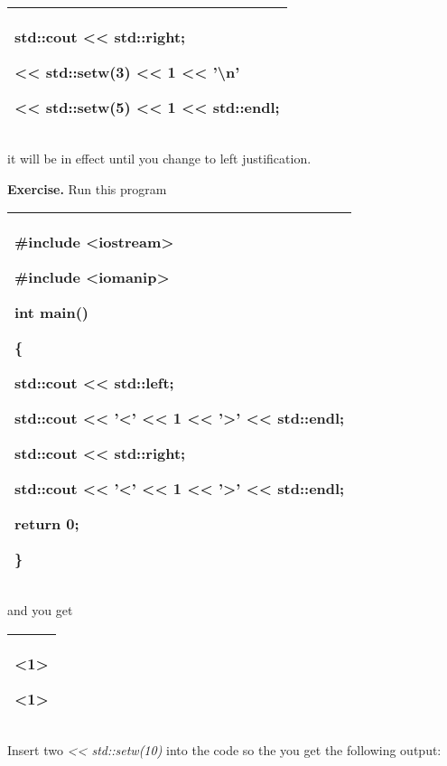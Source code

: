\documentclass[
]{article}
\begin{document}
\begin{longtable}[]{@{}l@{}}
\toprule
\endhead
\begin{minipage}[t]{0.97\columnwidth}\raggedright
std::cout \textless\textless{} std::right;

\textless\textless{} std::setw(3) \textless\textless{} 1
\textless\textless{} '\textbackslash n'

\textless\textless{} std::setw(5) \textless\textless{} 1
\textless\textless{} std::endl;\strut
\end{minipage}\tabularnewline
\bottomrule
\end{longtable}

it will be in effect until you change to left justification.

\textbf{Exercise. }Run this program

\begin{longtable}[]{@{}l@{}}
\toprule
\endhead
\begin{minipage}[t]{0.97\columnwidth}\raggedright
\#include \textless iostream\textgreater{}

\#include \textless iomanip\textgreater{}

int main()

\{

std::cout \textless\textless{} std::left;

std::cout \textless\textless{} '\textless' \textless\textless{} 1
\textless\textless{} '\textgreater' \textless\textless{} std::endl;

std::cout \textless\textless{} std::right;

std::cout \textless\textless{} '\textless' \textless\textless{} 1
\textless\textless{} '\textgreater' \textless\textless{} std::endl;

return 0;

\}\strut
\end{minipage}\tabularnewline
\bottomrule
\end{longtable}

and you get

\begin{longtable}[]{@{}l@{}}
\toprule
\endhead
\begin{minipage}[t]{0.97\columnwidth}\raggedright
\textless1\textgreater{}

\textless1\textgreater{}\strut
\end{minipage}\tabularnewline
\bottomrule
\end{longtable}

Insert two \emph{\textless\textless{} std::setw(10)} into the code so
the you get the following output:
\end{document}
